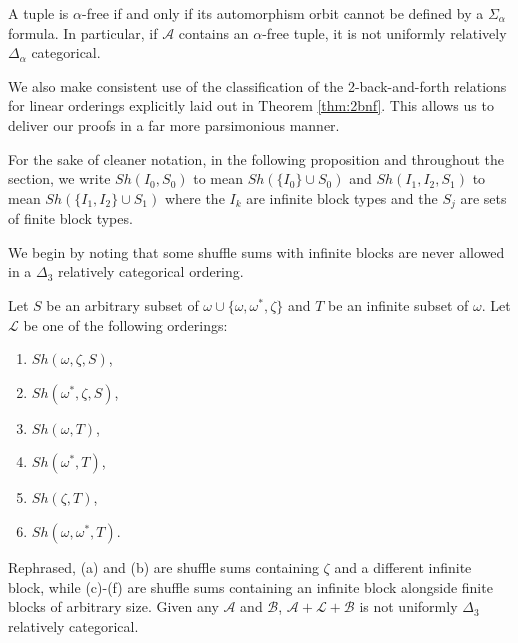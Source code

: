 \documentclass[11pt]{amsart}
\theoremstyle{definition}
\def\A{\mathcal A}
\def\B{\mathcal{B}}
\def\L{\mathcal L}
\begin{document}
\begin{proposition}[{\cite[Section 17.4]{AK00}}]
    A tuple is $\alpha$-free if and only if its automorphism orbit cannot be defined by a $\Sigma_\alpha$ formula.
    In particular, if $\A$ contains an $\alpha$-free tuple, it is not uniformly relatively $\Delta_\alpha$ categorical.
\end{proposition}

We also make consistent use of the classification of the 2-back-and-forth relations for linear orderings explicitly laid out in Theorem \ref{thm:2bnf}.
This allows us to deliver our proofs in a far more parsimonious manner.



\begin{convention}
    For the sake of cleaner notation, in the following proposition and throughout the section, we write $Sh(I_0,S_0)$ to mean $Sh(\{I_0\}\cup S_0)$ and $Sh(I_1,I_2,S_1)$ to mean $Sh(\{I_1,I_2\}\cup S_1)$ where the $I_k$ are infinite block types and the $S_j$ are sets of finite block types.
\end{convention}

We begin by noting that some shuffle sums with infinite blocks are never allowed in a $\Delta_3$ relatively categorical ordering.


\begin{proposition}\label{prop:forbiddenShuffles}
    Let $S$ be an arbitrary subset of $\omega\cup\{\omega,\omega^*,\zeta\}$ and $T$ be an infinite subset of $\omega$. Let $\L$ be one of the following orderings:
    \begin{enumerate}[label=(\alph*)]
        \item $Sh(\omega,\zeta,S)$,
        \item $Sh(\omega^*,\zeta,S)$,
        \item $Sh(\omega,T)$,
        \item $Sh(\omega^*,T)$,
        \item $Sh(\zeta,T)$,
        \item $Sh(\omega,\omega^*,T)$.
    \end{enumerate}
    Rephrased, (a) and (b) are shuffle sums containing $\zeta$ and a different infinite block, while (c)-(f) are shuffle sums containing an infinite block alongside finite blocks of arbitrary size.
    Given any $\A$ and $\B$, $\A+\L+\B$ is not uniformly $\Delta_3$ relatively categorical.
\end{proposition}
\end{document}
